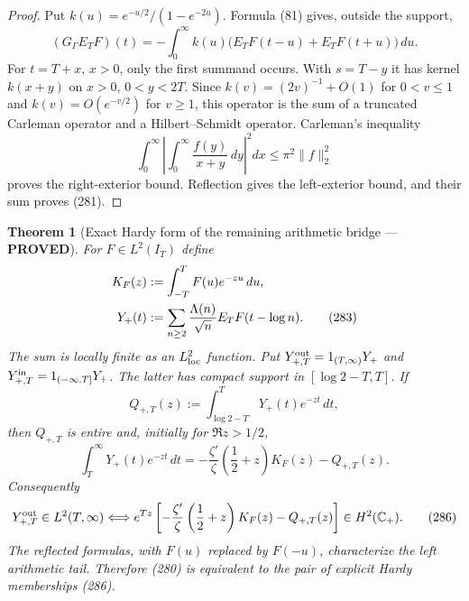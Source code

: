 \documentclass[11pt]{article}
\newtheorem{theorem}{Theorem}
\newcommand{\PROVED}{\textcolor{green!45!black}{\textbf{PROVED}}}
\begin{document}
\begin{proof}
Put $k(u)=e^{-u/2}/(1-e^{-2u})$.  Formula (81) gives, outside the support,
\begin{equation}
 (G_\Gamma E_TF)(t)
 =-\int_0^\infty k(u)
       \bigl(E_TF(t-u)+E_TF(t+u)\bigr)\,du.           \tag{282}
\end{equation}
For $t=T+x$, $x>0$, only the first summand occurs.  With $s=T-y$ it has
kernel $k(x+y)$ on $x>0$, $0<y<2T$.  Since
$k(v)=(2v)^{-1}+O(1)$ for $0<v\le1$ and
$k(v)=O(e^{-v/2})$ for $v\ge1$, this operator is the sum of a truncated
Carleman operator and a Hilbert--Schmidt operator.  Carleman's inequality
\[
 \int_0^\infty\left|\int_0^\infty
       \frac{f(y)}{x+y}\,dy\right|^2dx
 \le\pi^2\|f\|_2^2
\]
proves the right-exterior bound.  Reflection gives the left-exterior bound,
and their sum proves (281).
\end{proof}

\begin{theorem}[Exact Hardy form of the remaining arithmetic bridge ---
\PROVED]
For $F\in L^2(I_T)$ define
\begin{align}
 K_F(z)&:=\int_{-T}^{T}F(u)e^{-zu}\,du,\notag\\
 Y_+(t)&:=\sum_{n\ge2}\frac{\Lambda(n)}{\sqrt n}
                 E_TF(t-\log n).                     \tag{283}
\end{align}
The sum is locally finite as an $L^2_{\rm loc}$ function.  Put
$Y_{+,T}^{\rm out}=1_{(T,\infty)}Y_+$ and
$Y_{+,T}^{\rm in}=1_{(-\infty,T]}Y_+$.  The latter has compact support in
$[\log2-T,T]$.  If
\begin{equation}
 Q_{+,T}(z):=\int_{\log2-T}^{T}
               Y_+(t)e^{-zt}\,dt,                    \tag{284}
\end{equation}
then $Q_{+,T}$ is entire and, initially for $\Re z>1/2$,
\begin{equation}
 \int_T^\infty Y_+(t)e^{-zt}\,dt
 =-\frac{\zeta'}{\zeta}\left(\frac12+z\right)K_F(z)
  -Q_{+,T}(z).                                        \tag{285}
\end{equation}
Consequently
\begin{equation}
 Y_{+,T}^{\rm out}\in L^2(T,\infty)
 \Longleftrightarrow
 e^{Tz}\left[-\frac{\zeta'}{\zeta}
     \left(\frac12+z\right)K_F(z)-Q_{+,T}(z)\right]
 \in H^2(\mathbb C_+).                                \tag{286}
\end{equation}
The reflected formulas, with $F(u)$ replaced by $F(-u)$, characterize the
left arithmetic tail.  Therefore (280) is equivalent to the pair of
explicit Hardy memberships (286).
\end{theorem}
\end{document}
